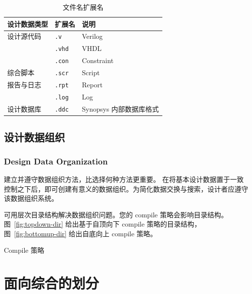 \begin{table}[htbp]
\centering
\caption{文件名扩展名}
\label{tab:file-ext}
\begin{tabularx}{\textwidth}{@{}l l X@{}}
\toprule
\textbf{设计数据类型} & \textbf{扩展名} & \textbf{说明} \\
\midrule
设计源代码 & \texttt{.v} & Verilog \\
 & \texttt{.vhd} & VHDL \\
 & \texttt{.con} & Constraint \\
综合脚本 & \texttt{.scr} & Script \\
报告与日志 & \texttt{.rpt} & Report \\
 & \texttt{.log} & Log \\
设计数据库 & \texttt{.ddc} & Synopsys 内部数据库格式 \\
\bottomrule
\end{tabularx}
\end{table}

\subsection{设计数据组织}
\subsubsection*{Design Data Organization}

建立并遵守数据组织方法，比选择何种方法更重要。
在将基本设计数据置于一致控制之下后，即可创建有意义的数据组织。为简化数据交换与搜索，设计者应遵守该数据组织系统。

可用层次目录结构解决数据组织问题。您的 compile 策略会影响目录结构。
图~\ref{fig:topdown-dir} 给出基于自顶向下 compile 策略的目录结构，图~\ref{fig:bottomup-dir} 给出自底向上 compile 策略。



\begin{seeAlsoBox}
Compile 策略
\end{seeAlsoBox}

\section{面向综合的划分}
